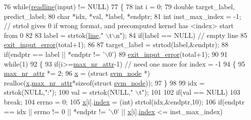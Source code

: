 \begin{DoxyCode}
{{76     \textcolor{keywordflow}{while}(\hyperlink{svm-predict_8c_aa324656b7bb4eb3ee42699d33c21ef7a}{readline}(input) != NULL)
77     \{
78         \textcolor{keywordtype}{int} i = 0;
79         \textcolor{keywordtype}{double} target\_label, predict\_label;
80         \textcolor{keywordtype}{char} *idx, *val, *label, *endptr;
81         \textcolor{keywordtype}{int} inst\_max\_index = -1; \textcolor{comment}{// strtol gives 0 if wrong format, and precomputed kernel has <index>
       start from 0}
82 
83         label = strtok(\hyperlink{svm-predict_8c_a8adb30f4f6669f927fd9232f686c637b}{line},\textcolor{stringliteral}{" \(\backslash\)t\(\backslash\)n"});
84         \textcolor{keywordflow}{if}(label == NULL) \textcolor{comment}{// empty line}
85             \hyperlink{svm-predict_8c_ada0be431a4ed2ba4b1a09d4449f2c75b}{exit\_input\_error}(total+1);
86 
87         target\_label = strtod(label,&endptr);
88         \textcolor{keywordflow}{if}(endptr == label || *endptr != \textcolor{charliteral}{'\(\backslash\)0'})
89             \hyperlink{svm-predict_8c_ada0be431a4ed2ba4b1a09d4449f2c75b}{exit\_input\_error}(total+1);
90 
91         \textcolor{keywordflow}{while}(1)
92         \{
93             \textcolor{keywordflow}{if}(i>=\hyperlink{svm-predict_8c_af95bde9162db2c5dd97e80795b3548ed}{max\_nr\_attr}-1) \textcolor{comment}{// need one more for index = -1}
94             \{
95                 \hyperlink{svm-predict_8c_af95bde9162db2c5dd97e80795b3548ed}{max\_nr\_attr} *= 2;
96                 \hyperlink{svm-predict_8c_a9a5b72a4065074cac5da07efb80a1e79}{x} = (\textcolor{keyword}{struct }\hyperlink{structsvm__node}{svm\_node} *) realloc(\hyperlink{svm-predict_8c_a9a5b72a4065074cac5da07efb80a1e79}{x},\hyperlink{svm-predict_8c_af95bde9162db2c5dd97e80795b3548ed}{max\_nr\_attr}*\textcolor{keyword}{sizeof}(\textcolor{keyword}{struct} 
      \hyperlink{structsvm__node}{svm\_node}));
97             \}
98 
99             idx = strtok(NULL,\textcolor{stringliteral}{":"});
100             val = strtok(NULL,\textcolor{stringliteral}{" \(\backslash\)t"});
101 
102             \textcolor{keywordflow}{if}(val == NULL)
103                 \textcolor{keywordflow}{break};
104             errno = 0;
105             \hyperlink{svm-predict_8c_a9a5b72a4065074cac5da07efb80a1e79}{x}[i].\hyperlink{structsvm__node_aa733ca75ee5a5c0f36af5ddb4c6394d9}{index} = (int) strtol(idx,&endptr,10);
106             \textcolor{keywordflow}{if}(endptr == idx || errno != 0 || *endptr != \textcolor{charliteral}{'\(\backslash\)0'} || \hyperlink{svm-predict_8c_a9a5b72a4065074cac5da07efb80a1e79}{x}[i].\hyperlink{structsvm__node_aa733ca75ee5a5c0f36af5ddb4c6394d9}{index} <= inst\_max\_index)
}}
\end{DoxyCode}
